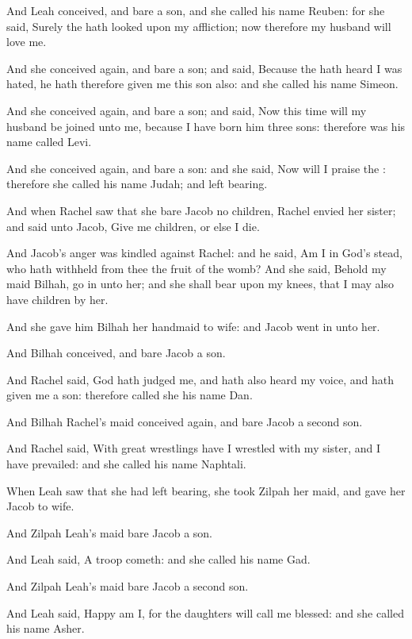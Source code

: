\Verse And Leah conceived, and bare a son, and she called his name Reuben: for she said, Surely the \LORD hath looked upon my affliction; now therefore my husband will love me.

\Verse And she conceived again, and bare a son; and said, Because the \LORD hath heard I was hated, he hath therefore given me this son also: and she called his name Simeon.

\Verse And she conceived again, and bare a son; and said, Now this time will my husband be joined unto me, because I have born him three sons: therefore was his name called Levi.

\Verse And she conceived again, and bare a son: and she said, Now will I praise the \LORD: therefore she called his name Judah; and left bearing.

\Chapter
\Verse And when Rachel saw that she bare Jacob no children, Rachel envied her sister; and said unto Jacob, Give me children, or else I die.

\Verse And Jacob's anger was kindled against Rachel: and he said, Am I in God's stead, who hath withheld from thee the fruit of the womb?  \Verse And she said, Behold my maid Bilhah, go in unto her; and she shall bear upon my knees, that I may also have children by her.

\Verse And she gave him Bilhah her handmaid to wife: and Jacob went in unto her.

\Verse And Bilhah conceived, and bare Jacob a son.

\Verse And Rachel said, God hath judged me, and hath also heard my voice, and hath given me a son: therefore called she his name Dan.

\Verse And Bilhah Rachel's maid conceived again, and bare Jacob a second son.

\Verse And Rachel said, With great wrestlings have I wrestled with my sister, and I have prevailed: and she called his name Naphtali.

\Verse When Leah saw that she had left bearing, she took Zilpah her maid, and gave her Jacob to wife.

\Verse And Zilpah Leah's maid bare Jacob a son.

\Verse And Leah said, A troop cometh: and she called his name Gad.

\Verse And Zilpah Leah's maid bare Jacob a second son.

\Verse And Leah said, Happy am I, for the daughters will call me blessed: and she called his name Asher.


